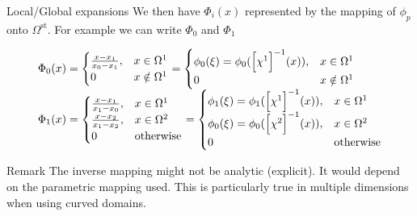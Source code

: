 \begin{frame}{Local/Global expansions}
  We then have $\Phi_i(x)$ represented by the mapping of $\phi_p$ onto $\Omega^{\text{st}}$. For example we can write $\Phi_0$ and $\Phi_1$

  \begin{equation}
    \label{eq:57}
    \begin{array}[c]{l}
      \Phi_0(x) =
    \begin{cases}
      \frac{x-x_1}{x_0-x_1}, & x \in \Omega^1\\
      0 & x \notin \Omega^1
    \end{cases}
    =
    \begin{cases}
      \phi_0(\xi) = \phi_0(\Big[ \chi^1\Big]^{-1} (x)), & x \in \Omega^1\\
      0 & x \notin \Omega^1
    \end{cases}\\
    \Phi_1(x) =
    \begin{cases}
      \frac{x-x_1}{x_1-x_0}, & x \in \Omega^1\\
      \frac{x-x_2}{x_1-x_2}, & x \in \Omega^2\\
      0 & \text{otherwise}
    \end{cases}
    =
    \begin{cases}
      \phi_1(\xi) = \phi_1(\Big[ \chi^1\Big]^{-1} (x)), & x \in \Omega^1\\
      \phi_0(\xi) = \phi_0(\Big[ \chi^2\Big]^{-1} (x)), & x \in \Omega^2\\
      0 & \text{otherwise}
    \end{cases}\\
    \end{array}
  \end{equation}

  \begin{block}{Remark}
    The inverse mapping might not be analytic (explicit). It would
    depend on the parametric mapping used. This is particularly true
    in multiple dimensions when using curved domains.
  \end{block}


\end{frame}


